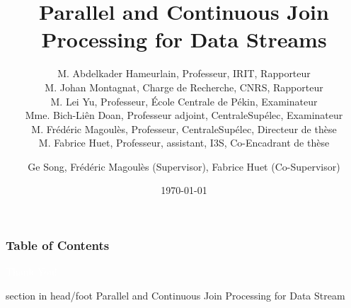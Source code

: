 \documentclass{beamer}
\title[Parallel and Continuous Join Processing for Data Streams]{Parallel and Continuous Join Processing for Data Streams}
\subtitle{
M. Abdelkader Hameurlain, Professeur, IRIT, Rapporteur \\
M. Johan Montagnat, Charge de Recherche, CNRS, Rapporteur \\
M. Lei Yu, Professeur, École Centrale de Pékin, Examinateur \\
Mme. Bich-Liên Doan, Professeur adjoint, CentraleSupélec, Examinateur \\
M. Frédéric Magoulès, Professeur, CentraleSupélec, Directeur de thèse \\
M. Fabrice Huet, Professeur, assistant, I3S, Co-Encadrant de thèse
}
\author[G. Song, F. Magoulès, F. Huet]{
Ge Song, Frédéric Magoulès (Supervisor), Fabrice Huet (Co-Supervisor) }
\institute[CentraleSupélec]{
Lab MICS\\
  CentraleSupélec \\
  Université Paris-Saclay}
\date[\today]{
 \today}
\begin{document}
\begin{frame}
  \titlepage
\end{frame}

\begin{frame}
  \frametitle{Table of Contents}

  \tableofcontents
\end{frame}





%

\begin{frame}[plain, b]
\centering
\huge \textcolor{white}{Thank You!}
\normalsize

\vspace*{\fill}

 \begin{beamercolorbox}[wd=\paperwidth]{section in head/foot}
 \centering
Parallel and Continuous Join Processing for Data Stream
\vskip10pt
\end{beamercolorbox}
 \end{frame}
\end{document}
